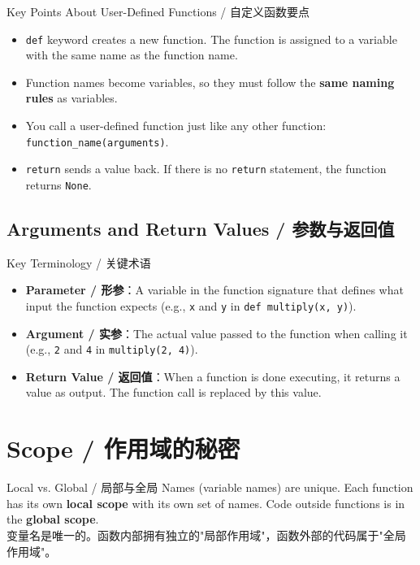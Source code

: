 \documentclass[11pt,a4paper]{article}
\begin{document}
\begin{concept}{Key Points About User-Defined Functions / 自定义函数要点}
    \begin{itemize}[itemsep=0.3em]
        \item \texttt{def} keyword creates a new function. The function is assigned to a variable with the same name as the function name.
        \item Function names become variables, so they must follow the \textbf{same naming rules} as variables.
        \item You call a user-defined function just like any other function: \texttt{function\_name(arguments)}.
        \item \texttt{return} sends a value back. If there is no \texttt{return} statement, the function returns \texttt{None}.
    \end{itemize}
\end{concept}

\subsection{Arguments and Return Values / 参数与返回值}

\begin{concept}{Key Terminology / 关键术语}
    \begin{itemize}[itemsep=0.5em]
        \item \textbf{Parameter / 形参}：A variable in the function signature that defines what input the function expects (e.g., \texttt{x} and \texttt{y} in \texttt{def multiply(x, y)}).
        \item \textbf{Argument / 实参}：The actual value passed to the function when calling it (e.g., \texttt{2} and \texttt{4} in \texttt{multiply(2, 4)}).
        \item \textbf{Return Value / 返回值}：When a function is done executing, it returns a value as output. The function call is replaced by this value.
    \end{itemize}
\end{concept}

\section{Scope / 作用域的秘密}

\begin{concept}{Local vs. Global / 局部与全局}
    Names (variable names) are unique. Each function has its own \textbf{local scope} with its own set of names. Code outside functions is in the \textbf{global scope}. \\
    变量名是唯一的。函数内部拥有独立的"局部作用域"，函数外部的代码属于"全局作用域"。
\end{concept}
\end{document}
